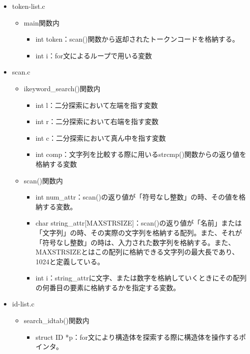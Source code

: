 \documentclass{jarticle}
\begin{document}
\begin{itemize}
  \begin{itemize}
    \item token-list.c
    \begin{itemize}
      \item main関数内
      \begin{itemize}
        \item int token：scan()関数から返却されたトークンコードを格納する。
        \item int i：for文によるループで用いる変数
      \end{itemize}
    \end{itemize}
    \item scan.c
    \begin{itemize}
      \item ikeyword\_search()関数内
      \begin{itemize}
        \item int l：二分探索において左端を指す変数
        \item int r：二分探索において右端を指す変数
        \item int c：二分探索において真ん中を指す変数
        \item int comp：文字列を比較する際に用いるstrcmp()関数からの返り値を格納する変数
      \end{itemize}
      \item scan()関数内
      \begin{itemize}
        \item int num\_attr：scan()の返り値が「符号なし整数」の時、その値を格納する変数。
        \item char
        string\_attr[MAXSTRSIZE]：scan()の返り値が「名前」または「文字列」の時、その実際の文字列を格納する配列。また、それが「符号なし整数」の時は、入力された数字列を格納する。また、MAXSTRSIZEとはこの配列に格納できる文字列の最大長であり、1024と定義している。
        \item int i：string\_attrに文字、または数字を格納していくときにその配列の何番目の要素に格納するかを指定する変数。
      \end{itemize}
    \end{itemize}
    \item id-list.c
    \begin{itemize}
      \item search\_idtab()関数内
      \begin{itemize}
        \item struct ID *p：for文により構造体を探索する際に構造体を操作するポインタ。
      \end{itemize}

\end{itemize}
\end{itemize}
\end{itemize}
\end{document}
